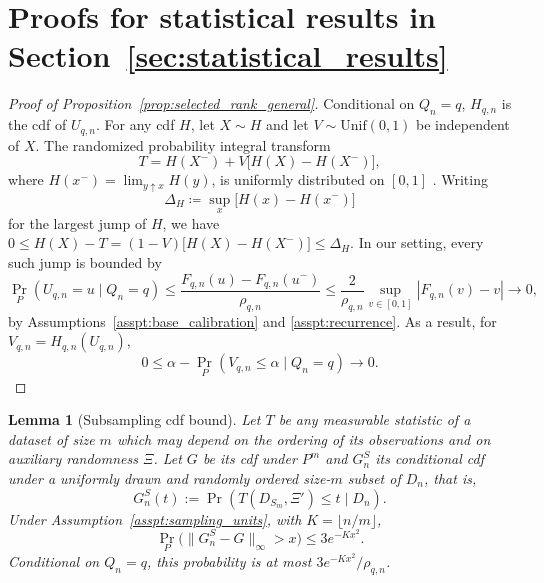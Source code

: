 \documentclass[10pt]{article}
\newtheorem{lemma}{Lemma}
\begin{document}
\section{Proofs for statistical results in Section~\ref{sec:statistical_results}}

\label{app:statistical_proofs}
\begin{proof}[Proof of Proposition~\ref{prop:selected_rank_general}]
Conditional on $Q_n=q$, $H_{q,n}$ is the cdf of $U_{q,n}$. For any cdf $H$, let $X\sim H$ and let $V\sim\mathrm{Unif}(0,1)$ be independent of $X$. The randomized probability integral transform
\[
T=H(X^-)+V\bigl[H(X)-H(X^-)\bigr],
\]
where $H(x^-)=\lim_{y\uparrow x}H(y)$, is uniformly distributed on $[0,1]$ \citep[Prop. 2.1]{ruschendorf2009distributional}.
Writing
\[
\Delta_H\coloneqq\sup_x\bigl[H(x)-H(x^-)\bigr]
\]
for the largest jump of $H$, we have
$ 0\le H(X)-T =(1-V)\bigl[H(X)-H(X^-)\bigr] \le\Delta_H.$
In our setting, every such jump is bounded by
\[
\Pr_P(U_{q,n}=u\mid Q_n=q)
\le\frac{F_{q,n}(u)-F_{q,n}(u^-)}{\rho_{q,n}}
\le \frac{2}{\rho_{q, n}} \sup _{v \in[0,1]}\left|F_{q, n}(v)-v\right| \longrightarrow 0,
\]
by Assumptions~\ref{asspt:base_calibration} and \ref{asspt:recurrence}.
As a result, for $V_{q,n}=H_{q,n}(U_{q,n})$,
\begin{equation}\label{eq:oracle_PIT_error}
0\le \alpha-\Pr_P(V_{q,n}\le\alpha\mid Q_n=q)
\to 0.
\end{equation}
\end{proof}

\begin{lemma}[Subsampling cdf bound]
\label{lem:uniform_subsampling_cdf}
Let $T$ be any measurable statistic of a dataset of size $m$ which may depend on the ordering of its observations and on auxiliary randomness $\Xi$. Let $G$ be its cdf under $P^m$ and $G_n^S$ its conditional cdf under a uniformly drawn and randomly ordered size-$m$ subset of $D_n$, that is,
\[
G_n^S(t):=
\Pr\left(T(D_{S_m},\Xi')\le t\mid D_n\right).
\]
Under Assumption~\ref{asspt:sampling_units}, with
$K=\lfloor n/m\rfloor$,
\[
\Pr_P\bigl(\|G_n^S-G\|_\infty>x\bigr)\le 3e^{-Kx^2}.
\]
Conditional on $Q_n=q$, this probability is at most $3e^{-Kx^2}/\rho_{q,n}$.
\end{lemma}
\end{document}
